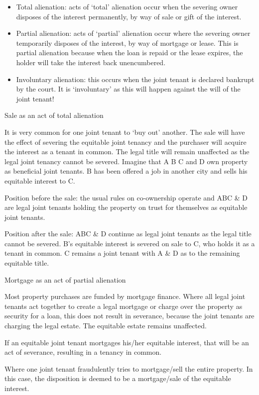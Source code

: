 \documentclass[
]{article}
\providecommand{\tightlist}{%
  \setlength{\itemsep}{0pt}\setlength{\parskip}{0pt}}
\newenvironment{env-de3101d4-f08b-48eb-bc0e-2fa06f3bcf8e}
{
    \savenotes\tcolorbox[blanker,breakable,left=5pt,borderline west={2pt}{-4pt}{purple}]
}
{
    \endtcolorbox\spewnotes
}
\begin{document}
\begin{itemize}
\tightlist
\item
  Total alienation: acts of `total' alienation occur when the severing
  owner disposes of the interest permanently, by way of sale or gift of
  the interest.
\item
  Partial alienation: acts of `partial' alienation occur where the
  severing owner temporarily disposes of the interest, by way of
  mortgage or lease. This is partial alienation because when the loan is
  repaid or the lease expires, the holder will take the interest back
  unencumbered.
\item
  Involuntary alienation: this occurs when the joint tenant is declared
  bankrupt by the court. It is `involuntary' as this will happen against
  the will of the joint tenant!
\end{itemize}

\begin{env-de3101d4-f08b-48eb-bc0e-2fa06f3bcf8e}

Sale as an act of total alienation

It is very common for one joint tenant to `buy out' another. The sale
will have the effect of severing the equitable joint tenancy and the
purchaser will acquire the interest as a tenant in common. The legal
title will remain unaffected as the legal joint tenancy cannot be
severed. Imagine that A B C and D own property as beneficial joint
tenants. B has been offered a job in another city and sells his
equitable interest to C.

Position before the sale: the usual rules on co-ownership operate and
ABC \& D are legal joint tenants holding the property on trust for
themselves as equitable joint tenants.

Position after the sale: ABC \& D continue as legal joint tenants as the
legal title cannot be severed. B's equitable interest is severed on sale
to C, who holds it as a tenant in common. C remains a joint tenant with
A \& D as to the remaining equitable title.

\end{env-de3101d4-f08b-48eb-bc0e-2fa06f3bcf8e}

\begin{env-de3101d4-f08b-48eb-bc0e-2fa06f3bcf8e}

Mortgage as an act of partial alienation

Most property purchases are funded by mortgage finance. Where all legal
joint tenants act together to create a legal mortgage or charge over the
property as security for a loan, this does not result in severance,
because the joint tenants are charging the legal estate. The equitable
estate remains unaffected.

If an equitable joint tenant mortgages his/her equitable interest, that
will be an act of severance, resulting in a tenancy in common.

Where one joint tenant fraudulently tries to mortgage/sell the entire
property. In this case, the disposition is deemed to be a mortgage/sale
of the equitable interest.

\end{env-de3101d4-f08b-48eb-bc0e-2fa06f3bcf8e}
\end{document}
